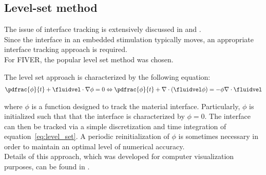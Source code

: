 \documentclass[../main.tex]{subfiles}
\begin{document}
\subsection{Level-set method}\label{sec:interface_tracking}

The issue of interface tracking is extensively discussed in \cite{Wang2012} and \cite{Fedkiw2003}.\\

Since the interface in an embedded stimulation typically moves, an appropriate interface tracking approach is required.\\
For \ac{FIVER}, the popular level set method \cite{Sethian1999} was chosen.

The level set approach is characterized by the following equation:
\begin{align}\label{eq:level_set}
\pdfrac{\phi}{t}+\fluidvel\cdot\nabla\phi=0 \Leftrightarrow \pdfrac{\phi}{t}+\nabla\cdot(\fluidvel\phi)=-\phi\nabla\cdot\fluidvel
\end{align}

where $\phi$ is a function designed to track the material interface. Particularly, $\phi$ is initialized such that that the interface is characterized by $\phi=0$. The interface can then be tracked via a simple discretization and time integration of equation~\eqref{eq:level_set}.
A periodic reinitialization of $\phi$ is sometimes necessary in order to maintain an optimal level of numerical accuracy.\\ 
Details of this approach, which was developed for computer visualization purposes, can be found in \cite{Sethian1999}.
\end{document}
